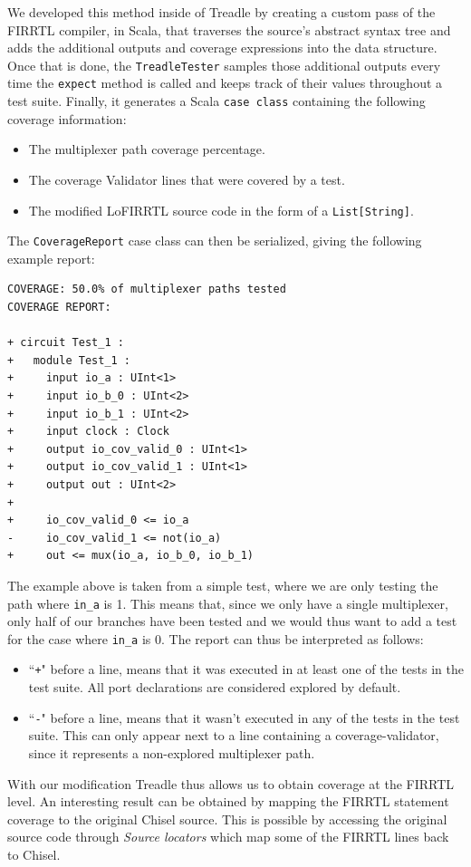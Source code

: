 \documentclass[conference]{IEEEtran}
\begin{document}
We developed this method inside of Treadle by creating a custom pass of the FIRRTL compiler, in Scala, that traverses the source's abstract syntax tree and adds the additional outputs and coverage expressions into the data structure. Once that is done, the \texttt{TreadleTester} samples those additional outputs every time the \texttt{expect} method is called and keeps track of their values throughout a test suite. Finally, it generates a Scala \texttt{case class} containing the following coverage information:
\begin{itemize}
\item The multiplexer path coverage percentage.
\item The coverage Validator lines that were covered by a test.
\item The modified LoFIRRTL source code in the form of a \texttt{List[String]}.
\end{itemize}
The \texttt{CoverageReport} case class can then be serialized, giving the following example report:
\begin{verbatim}
COVERAGE: 50.0% of multiplexer paths tested
COVERAGE REPORT:

+ circuit Test_1 :
+   module Test_1 :
+     input io_a : UInt<1>
+     input io_b_0 : UInt<2>
+     input io_b_1 : UInt<2>
+     input clock : Clock
+     output io_cov_valid_0 : UInt<1>
+     output io_cov_valid_1 : UInt<1>
+     output out : UInt<2>
+   
+     io_cov_valid_0 <= io_a
-     io_cov_valid_1 <= not(io_a)
+     out <= mux(io_a, io_b_0, io_b_1)
\end{verbatim}
The example above is taken from a simple test, where we are only testing the path where \texttt{in\_a} is 1. This means that, since we only have a single multiplexer, only half of our branches have been tested and we would thus want to add a test for the case where \texttt{in\_a} is 0. The report can thus be interpreted as follows:  
\begin{itemize}
\item ``\texttt{+}" before a line, means that it was executed in at least one of the tests in the test suite. All port declarations are considered explored by default.
\item ``\texttt{-}" before a line, means that it wasn't executed in any of the tests in the test suite. This can only appear next to a line containing a coverage-validator, since it represents a non-explored multiplexer path.
\end{itemize}

With our modification Treadle thus allows us to obtain coverage at the FIRRTL level. An interesting result can be obtained by mapping the FIRRTL statement coverage to the original Chisel source. This is possible by accessing the original source code through \textit{Source locators} which map some of the FIRRTL lines back to Chisel.
\end{document}
